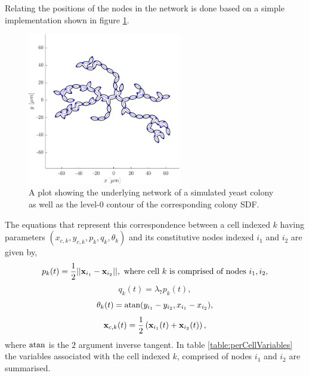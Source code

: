 Relating the positions of the nodes in the network is done 
based on a simple implementation shown in figure \ref{fig:yeastMicrograph}.
\begin{figure}[!htb]
    \centering
    \includegraphics[width=0.6\textwidth]{chapter1/figures/networkYeast.pdf}
    \caption{A plot showing the underlying network of a simulated yeast colony 
            as well as the level-$0$ contour of the corresponding colony SDF.}
    \label{fig:yeastMicrograph}
\end{figure}
The equations that represent this correspondence between a cell indexed $k$ having 
parameters $(x_{c,k}, y_{c,k}, p_k, q_k, \theta_k)$
and its constitutive nodes indexed $i_1$ and $i_2$ are given by,
\begin{equation}
    p_k(t) = \frac{1}{2}||\vb{x}_{i_1} - \vb{x}_{i_2}||, \ 
    \textrm{where cell} \ k \ \textrm{is comprised of nodes} \ i_1, i_2, 
\end{equation}
\begin{equation}
    q_k(t) = \lambda_7 p_k(t), 
\end{equation}
\begin{equation}
    \theta_k(t) = \atan (y_{i_1} - y_{i_2},x_{i_1} - x_{i_2} ), 
\end{equation}
\begin{equation}
    \vb{x}_{c,k}(t) = \frac{1}{2} \left(\vb{x}_{i_1}(t) + \vb{x}_{i_2}(t)\right),
\end{equation}
where $\atan$ is the $2$ argument inverse tangent. In table \ref{table:perCellVariables} the variables 
associated with the cell indexed $k$, comprised of nodes $i_1$ and $i_2$ are summarised.


